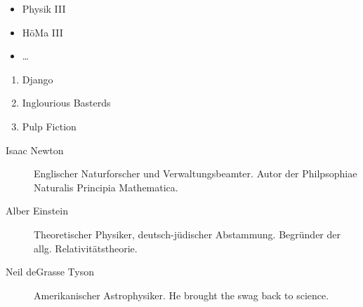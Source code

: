 \documentclass{scrartcl}
\begin{document}
\begin{itemize}
  \item Physik III
  \item HöMa III
  \item …
\end{itemize}

\begin{enumerate}
  \item Django
  \item Inglourious Basterds
  \item Pulp Fiction
\end{enumerate}

\begin{description}
  \item[Isaac Newton] Englischer Naturforscher und Verwaltungsbeamter. Autor der Philpsophiae Naturalis Principia Mathematica.
  \item[Alber Einstein] Theoretischer Physiker, deutsch-jüdischer Abstammung. Begründer der allg. Relativitätstheorie.
  \item[Neil deGrasse Tyson] Amerikanischer Astrophysiker. He brought the swag back to science.
\end{description}
\end{document}
